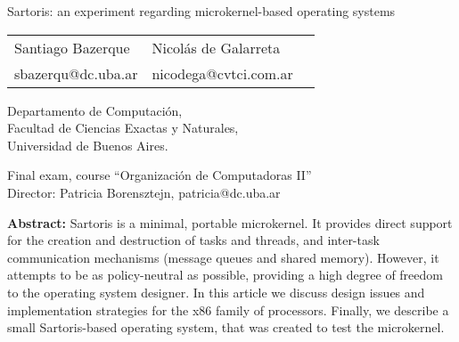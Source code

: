 \documentclass[12pt, letterpaper, oneside, english]{article}
\begin{document}
\begin{center}
\begin{huge}
Sartoris: an experiment regarding microkernel-based operating systems \\
\end{huge}
\end{center}

\vspace{0.5cm}

\begin{center}
\begin{tabular}{lll}
Santiago Bazerque & Nicol\'as de Galarreta \\
sbazerqu@dc.uba.ar & nicodega@cvtci.com.ar\\
\end{tabular}
\end{center}

\begin{small}
\begin{center}
Departamento de Computaci\'on, \\
Facultad de Ciencias Exactas y Naturales, \\
Universidad de Buenos Aires. \\
\end{center}
\end{small}

\vspace{0.5cm}
\begin{small}
\begin{center}
\noindent Final exam, course ``Organizaci\'on de Computadoras II'' \\
Director: Patricia Borensztejn, patricia@dc.uba.ar \\
\end{center}
\end{small}

\vspace{0.5cm}
\textbf{Abstract:} Sartoris is a minimal, portable microkernel. It provides direct support for the creation and destruction of tasks and threads, and inter-task communication mechanisms (message queues and shared memory). However, it attempts to be as policy-neutral as possible, providing a high degree of freedom to the operating system designer. In this article we discuss design issues and implementation strategies for the x86 family of processors. Finally, we describe a small Sartoris-based operating system, that was created to test the microkernel.

\vspace{1cm}
\end{document}
